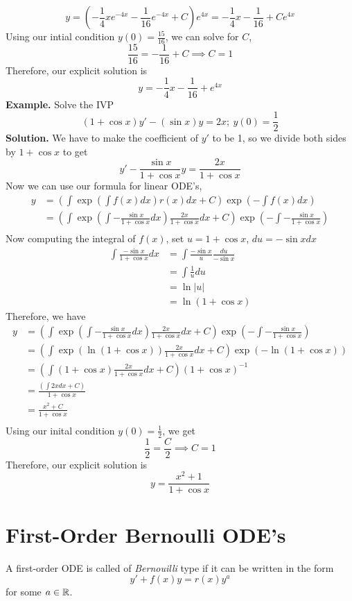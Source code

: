 \documentclass[openany]{report}
\begin{document}
\[y = \left(-\frac{1}{4}xe^{-4x} - \frac{1}{16}e^{-4x} + C\right)e^{4x} = -\frac{1}{4}x - \frac{1}{16} + Ce^{4x}\]
Using our intial condition $y(0) = \frac{15}{16}$, we can solve for $C$,
\[\frac{15}{16} = -\frac{1}{16} + C \implies C = 1 \]
Therefore, our explicit solution is
\[y = -\frac{1}{4}x - \frac{1}{16} + e^{4x}\]
\textbf{Example.} Solve the IVP
\[(1 + \cos x)y' - (\sin x)y = 2x; \ y(0) = \frac{1}{2}\]
\textbf{Solution.} We have to make the coefficient of $y'$ to be 1, so we divide both sides by $1 + \cos x$ to get
\[y' - \frac{\sin x}{1 + \cos x} y = \frac{2x}{1 + \cos x}\]
Now we can use our formula for linear ODE's,
\begin{align*}
    y &= \left(\int \exp\left(\int f(x)dx\right)r(x)dx + C\right)\exp\left(-\int f(x)dx\right)\\
    &= \left(\int \exp\left(\int - \frac{\sin x}{1 + \cos x}dx\right)\frac{2x}{1 + \cos x}dx + C\right)\exp\left(-\int- \frac{\sin x}{1 + \cos x}\right)\\
\end{align*}
Now computing the integral of $f(x)$, set $u = 1 + \cos x$, $du = -\sin x dx$
\begin{align*}
    \int \frac{-\sin x}{1 + \cos x} dx &= \int \frac{-\sin x}{u} \frac{du}{- \sin x}\\
    &= \int \frac{1}{u}du\\
    &= \ln|u| \\
    &= \ln (1 + \cos x)
\end{align*} 
Therefore, we have 
\begin{align*}
    y &= \left(\int \exp\left(\int - \frac{\sin x}{1 + \cos x}dx\right)\frac{2x}{1 + \cos x}dx + C\right)\exp\left(-\int- \frac{\sin x}{1 + \cos x}\right)\\
    &= \left(\int \exp(\ln(1 + \cos x))\frac{2x}{1 + \cos x}dx + C\right)\exp\left(-\ln (1 + \cos x)\right)\\
    &= \left(\int (1 + \cos x)\frac{2x}{1 + \cos x}dx + C\right)(1 + \cos x)^{-1}\\
    &= \frac{\left(\int 2xdx + C\right)}{1 + \cos x}\\
    &= \frac{x^2 + C}{1 + \cos x}\\
\end{align*}
Using our inital condition $y(0) = \frac{1}{2}$, we get 
\[\frac{1}{2} = \frac{C}{2} \implies C = 1\]
Therefore, our explicit solution is
\[y = \frac{x^2 + 1}{1 + \cos x}\]
\section{First-Order Bernoulli ODE's}
\begin{definition}
    A first-order ODE is called of \emph{Bernouilli} type if it can be written in the form
    \[y' + f(x)y = r(x)y^a\]
    for some $a \in \mathbb{R}$.  
\end{definition}
\end{document}
